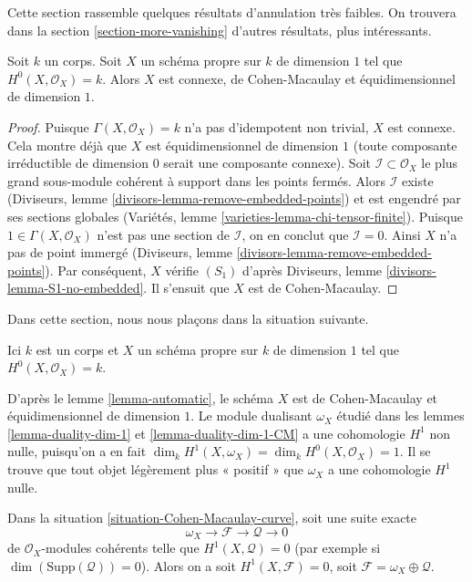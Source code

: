 \noindent
Cette section rassemble quelques résultats d'annulation très faibles. On trouvera dans la section \ref{section-more-vanishing} d'autres résultats, plus intéressants.

\begin{lemma}
\label{lemma-automatic}
Soit $k$ un corps. Soit $X$ un schéma propre sur $k$ de dimension $1$ tel que $H^0(X, \mathcal{O}_X) = k$. Alors $X$ est connexe, de Cohen-Macaulay et équidimensionnel de dimension $1$.
\end{lemma}

\begin{proof}
Puisque $\Gamma(X, \mathcal{O}_X) = k$ n'a pas d'idempotent non trivial, $X$ est connexe. Cela montre déjà que $X$ est équidimensionnel de dimension $1$ (toute composante irréductible de dimension $0$ serait une composante connexe). Soit $\mathcal{I} \subset \mathcal{O}_X$ le plus grand sous-module cohérent à support dans les points fermés. Alors $\mathcal{I}$ existe (Diviseurs, lemme \ref{divisors-lemma-remove-embedded-points}) et est engendré par ses sections globales (Variétés, lemme \ref{varieties-lemma-chi-tensor-finite}). Puisque $1 \in \Gamma(X, \mathcal{O}_X)$ n'est pas une section de $\mathcal{I}$, on en conclut que $\mathcal{I} = 0$. Ainsi $X$ n'a pas de point immergé (Diviseurs, lemme \ref{divisors-lemma-remove-embedded-points}). Par conséquent, $X$ vérifie $(S_1)$ d'après Diviseurs, lemme \ref{divisors-lemma-S1-no-embedded}. Il s'ensuit que $X$ est de Cohen-Macaulay.
\end{proof}

\noindent
Dans cette section, nous nous plaçons dans la situation suivante.

\begin{situation}
\label{situation-Cohen-Macaulay-curve}
Ici $k$ est un corps et $X$ un schéma propre sur $k$ de dimension $1$ tel que $H^0(X, \mathcal{O}_X) = k$.
\end{situation}

\noindent
D'après le lemme \ref{lemma-automatic}, le schéma $X$ est de Cohen-Macaulay et équidimensionnel de dimension $1$. Le module dualisant $\omega_X$ étudié dans les lemmes \ref{lemma-duality-dim-1} et \ref{lemma-duality-dim-1-CM} a une cohomologie $H^1$ non nulle, puisqu'on a en fait $\dim_k H^1(X, \omega_X) = \dim_k H^0(X, \mathcal{O}_X) = 1$. Il se trouve que tout objet légèrement plus « positif » que $\omega_X$ a une cohomologie $H^1$ nulle.

\begin{lemma}
\label{lemma-vanishing}
Dans la situation \ref{situation-Cohen-Macaulay-curve}, soit une suite exacte $$
\omega_X \to \mathcal{F} \to \mathcal{Q} \to 0
$$ de $\mathcal{O}_X$-modules cohérents telle que $H^1(X, \mathcal{Q}) = 0$ (par exemple si $\dim(\text{Supp}(\mathcal{Q})) = 0$). Alors on a soit $H^1(X, \mathcal{F}) = 0$, soit $\mathcal{F} = \omega_X \oplus \mathcal{Q}$.
\end{lemma}

